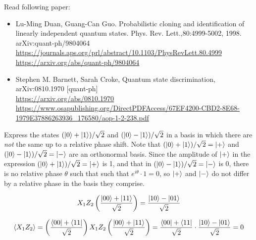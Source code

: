 Read following paper:
\begin{itemize}
    \item Lu-Ming Duan, Guang-Can Guo.  Probabilistic cloning and identification of linearly independent quantum states. Phys. Rev. Lett.,80:4999-5002, 1998. arXiv:quant-ph/9804064\\
    \url{https://journals.aps.org/prl/abstract/10.1103/PhysRevLett.80.4999}\\
    \url{https://arxiv.org/abs/quant-ph/9804064}
%
    \item Stephen M. Barnett, Sarah Croke, Quantum state discrimination, arXiv:0810.1970 [quant-ph]\\
    \url{https://arxiv.org/abs/0810.1970}\\
    \url{https://www.osapublishing.org/DirectPDFAccess/67EF4200-CBD2-8E68-1979E37886263936_176580/aop-1-2-238.pdf}
\end{itemize}


 Express the states $(\ket{0}+\ket{1})/\sqrt{2}$ and $(\ket{0}-\ket{1})/\sqrt{2}$ in a basis in which there are \textit{not} the same up to a relative phase shift.
\Soln Note that $(\ket{0} + \ket{1})/\sqrt{2} = \ket{+}$ and $(\ket{0}-\ket{1})/\sqrt{2}=\ket{-}$ are an orthonormal basis. Since the amplitude of $\ket{+}$ in the expression $(\ket{0} + \ket{1})/\sqrt{2} = \ket{+}$ is 1, and that in $(\ket{0} - \ket{1})/\sqrt{2} = \ket{-}$ is 0, there is no relative phase $\theta$ such that such that $e^{i\theta}\cdot 1 = 0$, so $\ket{+}$ and $\ket{-}$ do not differ by a relative phase in the basis they comprise.


\begin{align*}
     X_1 Z_2 \left(\frac{\ket{00} + \ket{11}}{\sqrt{2}} \right) = \frac{\ket{10} - \ket{01}}{\sqrt{2}}
\end{align*}


\begin{align*}
     \braket{X_1 Z_2} = \left(\frac{\bra{00} + \bra{11}}{\sqrt{2}} \right) X_1 Z_2 \left(\frac{\ket{00} + \ket{11}}{\sqrt{2}} \right)
    = \frac{\bra{00} + \bra{11}}{\sqrt{2}}  \cdot \frac{\ket{10} - \ket{01}}{\sqrt{2}}
    = 0
\end{align*}




